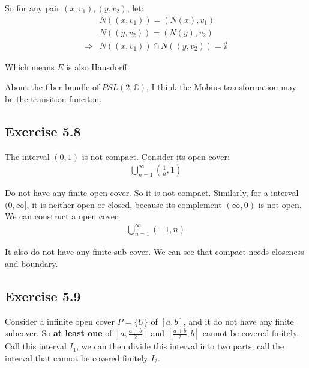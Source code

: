 \documentclass[]{ctexart}
\begin{document}
			So for any pair $(x,v_1),(y,v_2)$, let:
				\begin{equation*}
				\begin{aligned}
					&N((x,v_1))=(N(x),v_1)\\
					&N((y,v_2))=(N(y),v_2)\\
					\Rightarrow &N((x,v_1))\cap N((y,v_2))=\emptyset
				\end{aligned}
				\end{equation*}
			
			Which means $E$ is also Hausdorff.
			
			About the fiber bundle of $PSL(2,\mathbb{C})$, I think the Mobius transformation may be the transition funciton.  
		
	\subsection{Exercise 5.8}
		The interval $(0,1)$ is not compact. Consider its open cover:
			\begin{equation*}
			\begin{aligned}
				\bigcup_{n=1}^{\infty} (\frac{1}{n},1)
			\end{aligned}
			\end{equation*}
		
		Do not have any finite open cover. So it is not compact. Similarly, for a  interval $(0,\infty]$, it is neither open or closed, because its complement $(\infty,0) $ is not open. We can construct a open cover:
			\begin{equation*}
			\begin{aligned}
				\bigcup_{n=1}^{\infty} (-1,n)
			\end{aligned}
			\end{equation*} 
		
		It also do not have any finite sub cover. We can see that compact needs closeness and boundary. 
	
	\subsection{Exercise 5.9}
		Consider a infinite open cover $P=\{U\}$ of $[a,b]$, and it do not have any finite subcover. So \textbf{at least one }of $[a,\frac{a+b}{2}]$ and $[\frac{a+b}{2},b]$ cannot be covered finitely. Call this interval $I_1$, we can then divide this interval into two parts, call the interval that cannot be covered finitely $I_2$.
		
\end{document}
